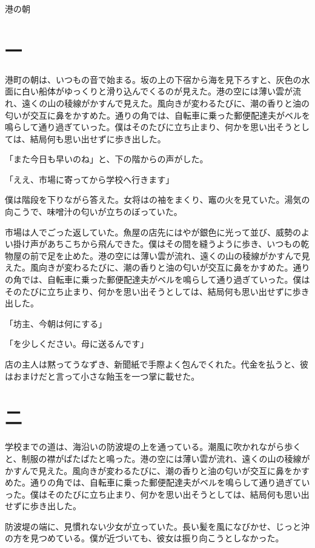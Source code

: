 \documentclass[tate,paper=a5,fontsize=10pt]{jlreq}
\begin{document}
\begin{center}{\Large 港の朝}\end{center}

\section*{一}
港町の朝は、いつもの音で始まる。坂の上の下宿から海を見下ろすと、灰色の水面に白い船体がゆっくりと滑り込んでくるのが見えた。港の空には薄い雲が流れ、遠くの山の稜線がかすんで見えた。風向きが変わるたびに、潮の香りと油の匂いが交互に鼻をかすめた。通りの角では、自転車に乗った郵便配達夫がベルを鳴らして通り過ぎていった。僕はそのたびに立ち止まり、何かを思い出そうとしては、結局何も思い出せずに歩き出した。

「また今日も早いのね」と、下の階からの声がした。

「ええ、市場に寄ってから学校へ行きます」

僕は階段を下りながら答えた。女将はの袖をまくり、竈の火を見ていた。湯気の向こうで、味噌汁の匂いが立ちのぼっていた。

市場は人でごった返していた。魚屋の店先にはやが銀色に光って並び、威勢のよい掛け声があちこちから飛んできた。僕はその間を縫うように歩き、いつもの乾物屋の前で足を止めた。港の空には薄い雲が流れ、遠くの山の稜線がかすんで見えた。風向きが変わるたびに、潮の香りと油の匂いが交互に鼻をかすめた。通りの角では、自転車に乗った郵便配達夫がベルを鳴らして通り過ぎていった。僕はそのたびに立ち止まり、何かを思い出そうとしては、結局何も思い出せずに歩き出した。

「坊主、今朝は何にする」

「を少しください。母に送るんです」

店の主人は黙ってうなずき、新聞紙で手際よく包んでくれた。代金を払うと、彼はおまけだと言って小さな飴玉を一つ掌に載せた。

\section*{二}
学校までの道は、海沿いの防波堤の上を通っている。潮風に吹かれながら歩くと、制服の襟がぱたぱたと鳴った。港の空には薄い雲が流れ、遠くの山の稜線がかすんで見えた。風向きが変わるたびに、潮の香りと油の匂いが交互に鼻をかすめた。通りの角では、自転車に乗った郵便配達夫がベルを鳴らして通り過ぎていった。僕はそのたびに立ち止まり、何かを思い出そうとしては、結局何も思い出せずに歩き出した。

防波堤の端に、見慣れない少女が立っていた。長い髪を風になびかせ、じっと沖の方を見つめている。僕が近づいても、彼女は振り向こうとしなかった。
\end{document}
